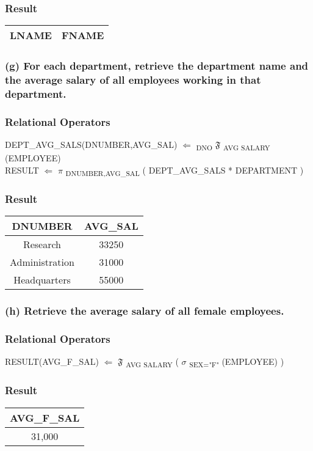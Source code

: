 \subsubsection*{Result}
\begin{center}
\begin{tabular}{ c | c }
  LNAME & FNAME \\ \hline
\end{tabular}
\end{center}
\subsubsection*{(g) For each department, retrieve the department name and the average salary of all employees working in that department.}
\subsubsection*{Relational Operators}
DEPT\_AVG\_SALS(DNUMBER,AVG\_SAL) $\Leftarrow$ \textsubscript{DNO} $\mathfrak{F}$ \textsubscript{AVG SALARY} (EMPLOYEE)\\
RESULT $\Leftarrow$ $\pi$ \textsubscript{DNUMBER,AVG\_SAL} ( DEPT\_AVG\_SALS * DEPARTMENT )

\subsubsection*{Result}
\begin{center}
\begin{tabular}{ c | c }
  DNUMBER & AVG\_SAL  \\ \hline
  Research & 33250 \\
  Administration & 31000 \\
  Headquarters & 55000 \\
\end{tabular}
\end{center}

\subsubsection*{(h) Retrieve the average salary of all female employees.}
\subsubsection*{Relational Operators}
RESULT(AVG\_F\_SAL) $\Leftarrow$ $\mathfrak{F}$ \textsubscript{AVG SALARY} ( $\sigma$ \textsubscript{SEX="F"} (EMPLOYEE) )

\subsubsection*{Result}
\begin{center}
\begin{tabular}{ c }
  AVG\_F\_SAL \\ \hline
  31,000 \\
\end{tabular}
\end{center}

